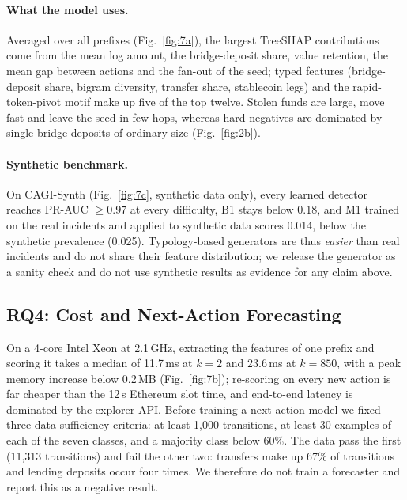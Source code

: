 \paragraph{What the model uses.}
Averaged over all prefixes (Fig.~\ref{fig:7a}), the largest TreeSHAP contributions come from the mean log amount, the bridge-deposit share, value retention, the mean gap between actions and the fan-out of the seed; typed features (bridge-deposit share, bigram diversity, transfer share, stablecoin legs) and the rapid-token-pivot motif make up five of the top twelve.
Stolen funds are large, move fast and leave the seed in few hops, whereas hard negatives are dominated by single bridge deposits of ordinary size (Fig.~\ref{fig:2b}).

\paragraph{Synthetic benchmark.}
On CAGI-Synth (Fig.~\ref{fig:7c}, synthetic data only), every learned detector reaches PR-AUC $\ge0.97$ at every difficulty, B1 stays below 0.18, and M1 trained on the real incidents and applied to synthetic data scores 0.014, below the synthetic prevalence (0.025).
Typology-based generators are thus \emph{easier} than real incidents and do not share their feature distribution; we release the generator as a sanity check and do not use synthetic results as evidence for any claim above.

\subsection{RQ4: Cost and Next-Action Forecasting}
\label{sec:rq4}

On a 4-core Intel Xeon at 2.1\,GHz, extracting the features of one prefix and scoring it takes a median of 11.7\,ms at $k=2$ and 23.6\,ms at $k=850$, with a peak memory increase below 0.2\,MB (Fig.~\ref{fig:7b}); re-scoring on every new action is far cheaper than the 12\,s Ethereum slot time, and end-to-end latency is dominated by the explorer API.
Before training a next-action model we fixed three data-sufficiency criteria: at least 1{,}000 transitions, at least 30 examples of each of the seven classes, and a majority class below 60\%.
The data pass the first (11{,}313 transitions) and fail the other two: transfers make up 67\% of transitions and lending deposits occur four times.
We therefore do not train a forecaster and report this as a negative result.

